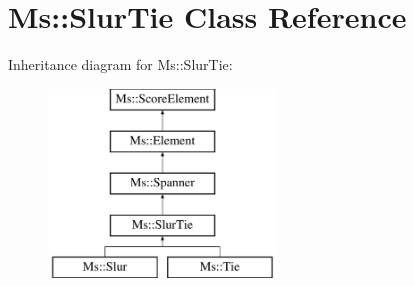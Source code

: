 \hypertarget{class_ms_1_1_slur_tie}{}\section{Ms\+:\+:Slur\+Tie Class Reference}
\label{class_ms_1_1_slur_tie}
Inheritance diagram for Ms\+:\+:Slur\+Tie\+:\begin{figure}[H]
\begin{center}
\leavevmode
\includegraphics[height=5.000000cm]{class_ms_1_1_slur_tie}
\end{center}
\end{figure}

